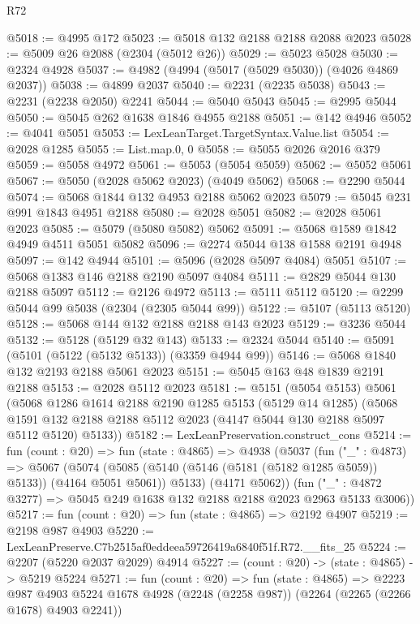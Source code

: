 \begin{lexlean}{R72}
\begin{coremodule}
@5018 := @4995 @172
@5023 := @5018 @132 @2188 @2188 @2088 @2023
@5028 := @5009 @26 @2088 (@2304 (@5012 @26))
@5029 := @5023 @5028
@5030 := @2324 @4928
@5037 := @4982 (@4994 (@5017 (@5029 @5030)) (@4026 @4869 @2037))
@5038 := @4899 @2037
@5040 := @2231 (@2235 @5038)
@5043 := @2231 (@2238 @2050) @2241
@5044 := @5040 @5043
@5045 := @2995 @5044
@5050 := @5045 @262 @1638 @1846 @4955 @2188
@5051 := @142 @4946
@5052 := @4041 @5051
@5053 := LexLeanTarget.TargetSyntax.Value.list
@5054 := @2028 @1285
@5055 := List.map.{0, 0}
@5058 := @5055 @2026 @2016 @379
@5059 := @5058 @4972
@5061 := @5053 (@5054 @5059)
@5062 := @5052 @5061
@5067 := @5050 (@2028 @5062 @2023) (@4049 @5062)
@5068 := @2290 @5044
@5074 := @5068 @1844 @132 @4953 @2188 @5062 @2023
@5079 := @5045 @231 @991 @1843 @4951 @2188
@5080 := @2028 @5051
@5082 := @2028 @5061 @2023
@5085 := @5079 (@5080 @5082) @5062
@5091 := @5068 @1589 @1842 @4949 @4511 @5051 @5082
@5096 := @2274 @5044 @138 @1588 @2191 @4948
@5097 := @142 @4944
@5101 := @5096 (@2028 @5097 @4084) @5051
@5107 := @5068 @1383 @146 @2188 @2190 @5097 @4084
@5111 := @2829 @5044 @130 @2188 @5097
@5112 := @2126 @4972
@5113 := @5111 @5112
@5120 := @2299 @5044 @99 @5038 (@2304 (@2305 @5044 @99))
@5122 := @5107 (@5113 @5120)
@5128 := @5068 @144 @132 @2188 @2188 @143 @2023
@5129 := @3236 @5044
@5132 := @5128 (@5129 @32 @143)
@5133 := @2324 @5044
@5140 := @5091 (@5101 (@5122 (@5132 @5133)) (@3359 @4944 @99))
@5146 := @5068 @1840 @132 @2193 @2188 @5061 @2023
@5151 := @5045 @163 @48 @1839 @2191 @2188
@5153 := @2028 @5112 @2023
@5181 := @5151
    (@5054 @5153)
    @5061
    (@5068
      @1286
      @1614
      @2188
      @2190
      @1285
      @5153
      (@5129 @14 @1285)
      (@5068 @1591 @132 @2188 @2188 @5112 @2023 (@4147 @5044 @130 @2188 @5097 @5112 @5120) @5133))
@5182 := LexLeanPreservation.construct_cons
@5214 := fun (count : @20) =>
  fun (state : @4865) =>
  @4938
    (@5037
      (fun ("_" : @4873) =>
      @5067
        (@5074 (@5085 (@5140 (@5146 (@5181 (@5182 @1285 @5059)) @5133)) (@4164 @5051 @5061)) @5133)
        (@4171 @5062))
      (fun ("_" : @4872 @3277) => @5045 @249 @1638 @132 @2188 @2188 @2023 @2963 @5133 @3006))
@5217 := fun (count : @20) => fun (state : @4865) => @2192 @4907
@5219 := @2198 @987 @4903
@5220 := LexLeanPreserve.C7b2515af0eddeea59726419a6840f51f.R72.__fits_25
@5224 := @2207 (@5220 @2037 @2029) @4914
@5227 := (count : @20) -> (state : @4865) -> @5219 @5224
@5271 := fun (count : @20) =>
  fun (state : @4865) =>
  @2223
    @987
    @4903
    @5224
    @1678
    @4928
    (@2248 (@2258 @987))
    (@2264 (@2265 (@2266 @1678) @4903 @2241))

\end{coremodule}
\end{lexlean}
